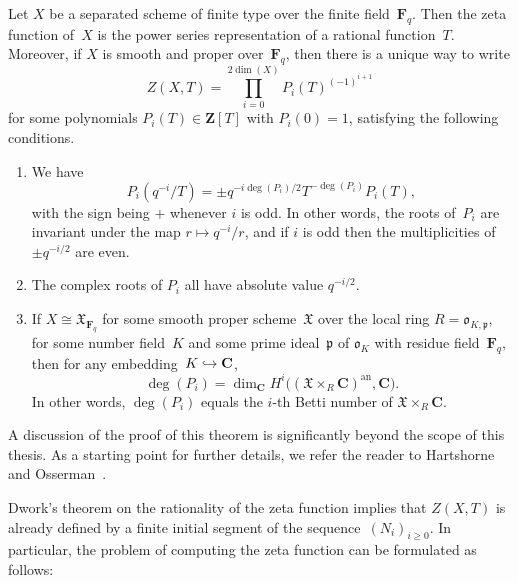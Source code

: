 \begin{thm} \label{thm:01-Zetafunctions}
Let $X$ be a separated scheme of finite type over the finite 
field~$\mathbf{F}_q$.  Then the zeta function of~$X$ is the power series 
representation of a rational function~$T$.  Moreover, if $X$ is smooth 
and proper over~$\mathbf{F}_q$, then there is a unique way to write 
\begin{equation}
Z(X, T) = \prod_{i=0}^{2 \dim(X)} P_i(T)^{(-1)^{i+1}}
\end{equation}
for some polynomials $P_i(T) \in \mathbf{Z}[T]$ with $P_i(0) = 1$, 
satisfying the following conditions.
\begin{enumerate}
\item We have 
\begin{equation*}
P_i(q^{-i} / T) = \pm q^{-i \deg(P_i) / 2} T^{- \deg(P_i)} P_i(T),
\end{equation*}
with the sign being $+$ whenever $i$ is odd.  In other words, the roots 
of~$P_i$ are invariant under the map $r \mapsto q^{-i} / r$, and if $i$ 
is odd then the multiplicities of $\pm q^{-i/2}$ are even.
\item The complex roots of $P_i$ all have absolute value $q^{-i/2}$.
\item If $X \cong \mathfrak{X}_{\mathbf{F}_q}$ for some smooth proper 
scheme~$\mathfrak{X}$ over the local ring $R = \mathfrak{o}_{K,\mathfrak{p}}$, 
for some number field~$K$ and some prime ideal~$\mathfrak{p}$ of 
$\mathfrak{o}_K$ with residue field~$\mathbf{F}_q$, then for any 
embedding~$K \hookrightarrow \mathbf{C}$, 
\begin{equation*}
\deg(P_i) = \dim_{\mathbf{C}} H^{i} \bigl( (\mathfrak{X} \times_R \mathbf{C})^{\text{an}}, \mathbf{C} \bigr).
\end{equation*}
In other words, $\deg(P_i)$ equals the $i$-th Betti number of 
$\mathfrak{X} \times_{R} \mathbf{C}$.
\end{enumerate}
\end{thm}

A discussion of the proof of this theorem is significantly 
beyond the scope of this thesis.  As a starting point for 
further details, we refer the reader to 
Hartshorne~\citep[Appendix~C]{Har77} and Osserman~\citep{Osserman2008}.

Dwork's theorem on the rationality of the zeta function implies 
that $Z(X, T)$ is already defined by a finite initial segment of 
the sequence~$(N_i)_{i \geq 0}$.  In particular, the problem of 
computing the zeta function can be formulated as follows:

